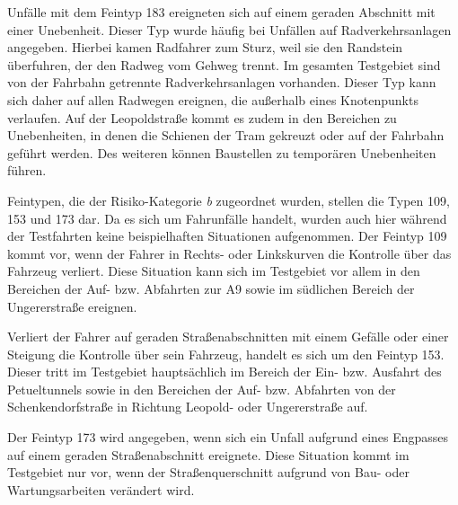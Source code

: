 Unfälle mit dem Feintyp 183 ereigneten sich auf einem geraden Abschnitt mit einer Unebenheit. Dieser Typ wurde häufig bei Unfällen auf Radverkehrsanlagen angegeben. Hierbei kamen Radfahrer zum Sturz, weil sie den Randstein überfuhren, der den Radweg vom Gehweg trennt. Im gesamten Testgebiet sind von der Fahrbahn getrennte Radverkehrsanlagen vorhanden. Dieser Typ kann sich daher auf allen Radwegen ereignen, die außerhalb eines Knotenpunkts verlaufen. Auf der Leopoldstraße kommt es zudem in den Bereichen zu Unebenheiten, in denen die Schienen der Tram gekreuzt oder auf der Fahrbahn geführt werden. Des weiteren können Baustellen zu temporären Unebenheiten führen.

Feintypen, die der Risiko-Kategorie \textit{b} zugeordnet wurden, stellen die Typen 109, 153 und 173 dar. Da es sich um Fahrunfälle handelt, wurden auch hier während der Testfahrten keine beispielhaften Situationen aufgenommen. Der Feintyp 109 kommt vor, wenn der Fahrer in Rechts- oder Linkskurven die Kontrolle über das Fahrzeug verliert. Diese Situation kann sich im Testgebiet vor allem in den Bereichen der Auf- bzw. Abfahrten zur A9 sowie im südlichen Bereich der Ungererstraße ereignen.

Verliert der Fahrer auf geraden Straßenabschnitten mit einem Gefälle oder einer Steigung die Kontrolle über sein Fahrzeug, handelt es sich um den Feintyp 153. Dieser tritt im Testgebiet hauptsächlich im Bereich der Ein- bzw. Ausfahrt des Petueltunnels sowie in den Bereichen der Auf- bzw. Abfahrten von der Schenkendorfstraße in Richtung Leopold- oder Ungererstraße auf.

Der Feintyp 173 wird angegeben, wenn sich ein Unfall aufgrund eines Engpasses auf einem geraden Straßenabschnitt ereignete. Diese Situation kommt im Testgebiet nur vor, wenn der Straßenquerschnitt aufgrund von Bau- oder Wartungsarbeiten verändert wird.

